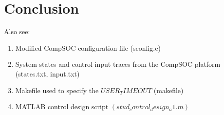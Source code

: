 \section{Conclusion}

Also see:
\begin{enumerate}
	\item Modified CompSOC configuration file (sconfig.c)
	\item System states	and	control	input traces from the CompSOC platform (states.txt,	input.txt)
	\item Makefile used	to	specify	the	$USER_TIMEOUT$	(makefile)
	\item MATLAB	control	design	script	$(stud_control_design_a1.m)$
\end{enumerate}
